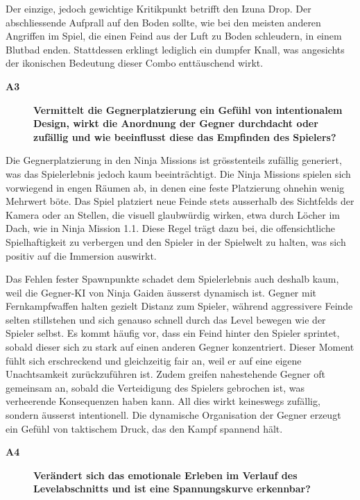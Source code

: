 \documentclass[../Main.tex]{subfiles}
\begin{document}
Der einzige, jedoch gewichtige Kritikpunkt betrifft den Izuna Drop. Der abschliessende Aufprall auf den Boden sollte, wie bei den meisten anderen Angriffen im Spiel, die einen Feind aus der Luft zu Boden schleudern, in einem Blutbad enden. Stattdessen erklingt lediglich ein dumpfer Knall, was angesichts der ikonischen Bedeutung dieser Combo enttäuschend wirkt.

\begin{description}
  \item[\textbf{A3}] \textbf{Vermittelt die Gegnerplatzierung ein Gefühl von intentionalem Design, wirkt die Anordnung der Gegner durchdacht oder zufällig und wie beeinflusst diese das Empfinden des Spielers?}
\end{description}

Die Gegnerplatzierung in den Ninja Missions ist grösstenteils zufällig generiert, was das Spielerlebnis jedoch kaum beeinträchtigt. Die Ninja Missions spielen sich vorwiegend in engen Räumen ab, in denen eine feste Platzierung ohnehin wenig Mehrwert böte. Das Spiel platziert neue Feinde stets ausserhalb des Sichtfelds der Kamera oder an Stellen, die visuell glaubwürdig wirken, etwa durch Löcher im Dach, wie in Ninja Mission 1.1. Diese Regel trägt dazu bei, die offensichtliche Spielhaftigkeit zu verbergen und den Spieler in der Spielwelt zu halten, was sich positiv auf die Immersion auswirkt.

Das Fehlen fester Spawnpunkte schadet dem Spielerlebnis auch deshalb kaum, weil die Gegner-KI von Ninja Gaiden äusserst dynamisch ist. Gegner mit Fernkampfwaffen halten gezielt Distanz zum Spieler, während aggressivere Feinde selten stillstehen und sich genauso schnell durch das Level bewegen wie der Spieler selbst. Es kommt häufig vor, dass ein Feind hinter den Spieler sprintet, sobald dieser sich zu stark auf einen anderen Gegner konzentriert. Dieser Moment fühlt sich erschreckend und gleichzeitig fair an, weil er auf eine eigene Unachtsamkeit zurückzuführen ist. Zudem greifen nahestehende Gegner oft gemeinsam an, sobald die Verteidigung des Spielers gebrochen ist, was verheerende Konsequenzen haben kann. All dies wirkt keineswegs zufällig, sondern äusserst intentionell. Die dynamische Organisation der Gegner erzeugt ein Gefühl von taktischem Druck, das den Kampf spannend hält.

\begin{description}
  \item[\textbf{A4}] \textbf{Verändert sich das emotionale Erleben im Verlauf des Levelabschnitts und ist eine Spannungskurve erkennbar?}
\end{description}
\end{document}
